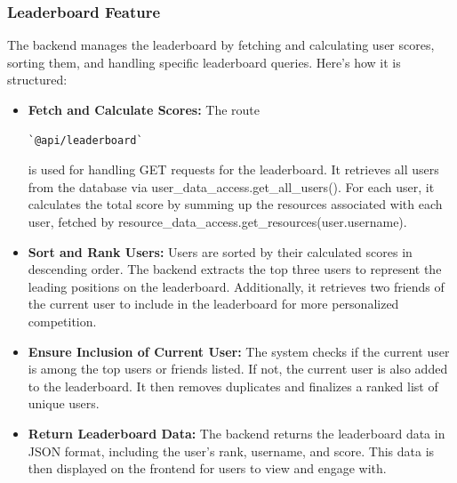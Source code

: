 \documentclass[12pt]{article}
\begin{document}
\subsubsection{Leaderboard Feature}
The backend manages the leaderboard by fetching and calculating user scores, sorting them, and handling specific leaderboard queries. Here's how it is structured:
\begin{itemize}
    \item \textbf{Fetch and Calculate Scores:} The route \begin{verbatim}`@api/leaderboard`\end{verbatim} is used for handling GET requests for the leaderboard. It retrieves all users from the database via user\_data\_access.get\_all\_users(). For each user, it calculates the total score by summing up the resources associated with each user, fetched by resource\_data\_access.get\_resources(user.username).
    \item \textbf{Sort and Rank Users:} Users are sorted by their calculated scores in descending order. The backend extracts the top three users to represent the leading positions on the leaderboard. Additionally, it retrieves two friends of the current user to include in the leaderboard for more personalized competition.
    \item \textbf{Ensure Inclusion of Current User:} The system checks if the current user is among the top users or friends listed. If not, the current user is also added to the leaderboard. It then removes duplicates and finalizes a ranked list of unique users.
    \item \textbf{Return Leaderboard Data:} The backend returns the leaderboard data in JSON format, including the user's rank, username, and score. This data is then displayed on the frontend for users to view and engage with.
\end{itemize}
\end{document}
